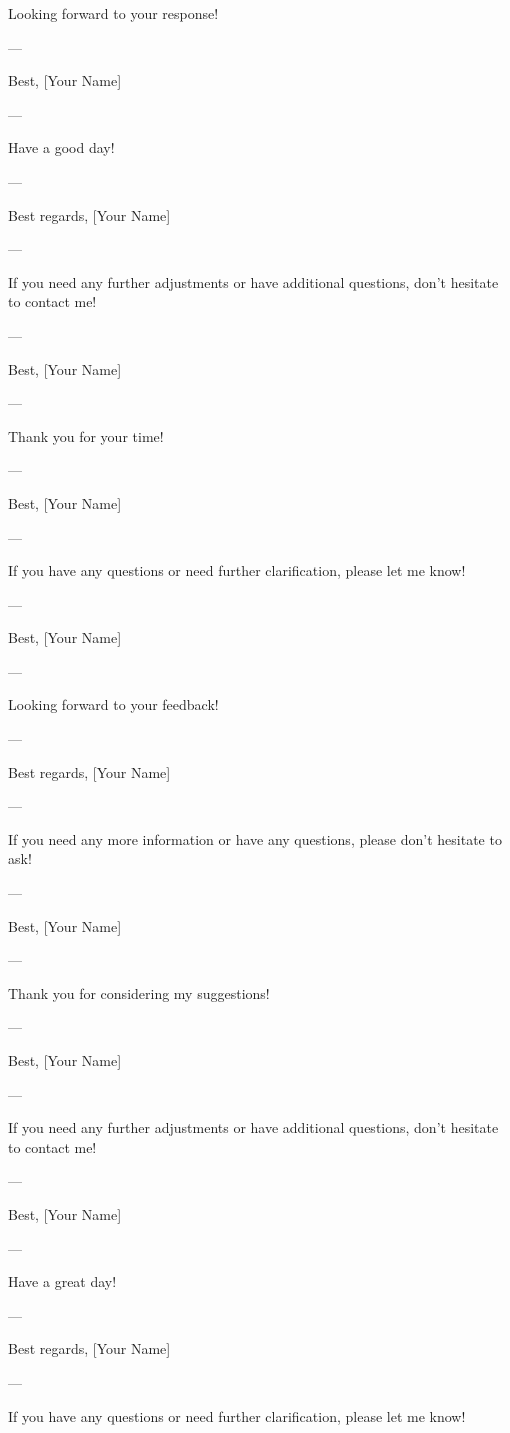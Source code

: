 Looking forward to your response! 

--- 

Best,  
[Your Name]  

--- 

Have a good day! 

--- 

Best regards,  
[Your Name]  

--- 

If you need any further adjustments or have additional questions, don't hesitate to contact me! 

--- 

Best,  
[Your Name]  

--- 

Thank you for your time! 

--- 

Best,  
[Your Name]  

--- 

If you have any questions or need further clarification, please let me know! 

--- 

Best,  
[Your Name]  

--- 

Looking forward to your feedback! 

--- 

Best regards,  
[Your Name]  

--- 

If you need any more information or have any questions, please don't hesitate to ask! 

--- 

Best,  
[Your Name]  

--- 

Thank you for considering my suggestions! 

--- 

Best,  
[Your Name]  

--- 

If you need any further adjustments or have additional questions, don't hesitate to contact me! 

--- 

Best,  
[Your Name]  

--- 

Have a great day! 

--- 

Best regards,  
[Your Name]  

--- 

If you have any questions or need further clarification, please let me know! 

